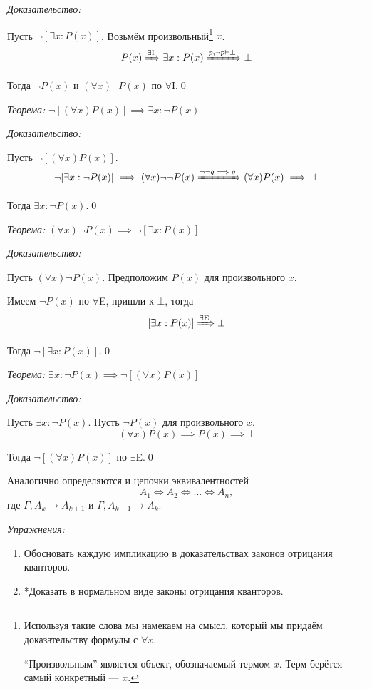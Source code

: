 {\it Доказательство:}

Пусть ${\lnot[\exists x:P(x)]}$.
Возьмём произвольный\footnote{
  Используя такие слова мы намекаем на смысл, который мы придаём доказательству
  формулы с $\forall x$.

  ``Произвольным'' является объект, обозначаемый термом $x$.
  Терм берётся самый конкретный --- $x$.} $x$.
\[
  P(x)\xRightarrow{\text{$\exists$I}} \exists x:P(x)
  \xRightarrow{p,\lnot p\vdash\bot} \bot
\]

Тогда $\lnot P(x)$ и $(\forall x)\lnot P(x)$
по $\forall$I.\qed

\pagebreak
{\it Теорема:} $\lnot[(\forall x)P(x)]\implies \exists x:\lnot P(x)$

{\it Доказательство:}

Пусть $\lnot[(\forall x)P(x)]$.
\[
  \lnot[\exists x:\lnot P(x)]\implies (\forall x)\lnot\lnot P(x)
  \xRightarrow{\lnot\lnot q\implies q} (\forall x)P(x)\implies\bot
\]

Тогда $\exists x:\lnot P(x)$.\qed

\vspace{1em}
{\it Теорема:} $(\forall x)\lnot P(x)\implies \lnot[\exists x:P(x)]$

{\it Доказательство:}

Пусть $(\forall x)\lnot P(x)$. Предположим $P(x)$ для произвольного $x$.

Имеем $\lnot P(x)$ по $\forall$E, пришли к $\bot$, тогда
\[
  [\exists x:P(x)]\xRightarrow{\text{$\exists$E}}\bot
\]

Тогда $\lnot[\exists x:P(x)]$.\qed

\vspace{1em}
{\it Теорема:} $\exists x:\lnot P(x)\implies\lnot[(\forall x)P(x)]$

{\it Доказательство:}

Пусть $\exists x:\lnot P(x)$. Пусть $\lnot P(x)$ для произвольного $x$.
\[
  (\forall x)P(x)\implies P(x)\implies \bot
\]

Тогда $\lnot[(\forall x)P(x)]$ по $\exists$E.\qed

\vspace{1em}
Аналогично определяются и цепочки эквивалентностей
\[
  A_1\iff A_2\iff ...\iff A_{n},
\]
где $\Gamma,A_{k}\to A_{k+1}$ и $\Gamma,A_{k+1}\to A_{k}$.

\vspace{1em}
{\it Упражнения:}
\begin{enumerate}
  \item{}Обосновать каждую импликацию в доказательствах законов отрицания кванторов.
  \item{}*Доказать в нормальном виде законы отрицания кванторов.
\end{enumerate}


